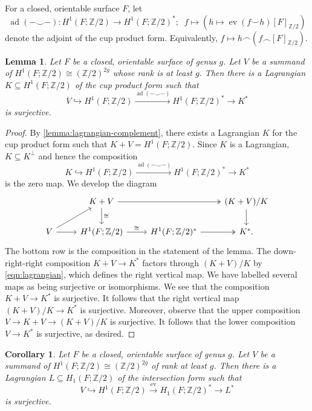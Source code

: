 \documentclass[a4paper, reqno]{amsart}
\newtheorem{corollary}[proposition]{Corollary}
\newtheorem{lemma}[proposition]{Lemma}
\theoremstyle{definition}
\theoremstyle{remark}
\newcommand{\Z}{\mathbb{Z}}
\newcommand{\into}{\hookrightarrow}
\DeclareMathOperator{\ev}{ev}
\begin{document}
For a closed, orientable surface $F$, let \[\operatorname{ad}(- \smile -) \colon H^1(F;\Z/2) \to H^1(F;\Z/2)^*;\; \; f \mapsto (h \mapsto \ev(f \smile h) [F]_{\Z/2})\] denote the adjoint of the cup product form. Equivalently, $f \mapsto h \frown (f \frown [F]_{\Z/2})$. 

\begin{lemma}\label{lemma:surjective-to-dual-of-lagrangian}
     Let $F$ be a closed, orientable surface of genus $g$. Let $V$ be a summand of $H^1(F;\Z/2)  \cong (\Z/2)^{2g}$ whose rank is at least $g$. Then there is a Lagrangian $K \subseteq H^1(F;\Z/2)$ of the cup product form such that 
     \[V \into H^1(F;\Z/2) \xrightarrow{\operatorname{ad}(- \smile -)} H^1(F;\Z/2)^* \to K^*\]
     is surjective. 
\end{lemma}

\begin{proof}
By \cref{lemma:lagrangian-complement}, there exists a Lagrangian $K$ for the cup product form such that $K +V = H^1(F;\Z/2)$. Since $K$ is a Lagrangian, $K \subseteq K^{\perp}$ and hence the composition
\begin{equation}\label{eqn:lagrangian}
    K \into H^1(F;\Z/2) \xrightarrow{\operatorname{ad}(- \smile -)} H^1(F;\Z/2)^* \to K^*
\end{equation}
is the zero map.  We develop the diagram
\[\begin{tikzcd}
 & K + V \ar[d,"\cong"] \ar[rr,twoheadrightarrow] & &   (K + V)/K \ar[d] \\
   V \ar[r] \ar[ur]  & H^1(F;\Z/2) \ar[r,"\cong"] &  H^1(F;\Z/2)^* \ar[r,twoheadrightarrow] & K^*.
\end{tikzcd}\]
The bottom row is the composition in the statement of the lemma. 
The down-right-right composition $K +V \to K^*$ factors through $(K+V)/K$ by \eqref{eqn:lagrangian}, which defines the right vertical map.  
We have labelled several maps as being surjective or isomorphisms. We see that the composition $K+V \to K^*$ is surjective. It follows that  the right vertical map $(K + V)/K \to K^*$ is surjective. Moreover, observe that the upper composition $V \to K+V \to (K + V)/K$ is surjective. It follows that the lower composition $V \to K^*$ is surjective, as desired. 
\end{proof}


\begin{corollary}\label{cor:surjective-to-dual-of-lagrangian}
     Let $F$ be a closed, orientable surface of genus $g$. Let $V$ be a summand of $H^1(F;\Z/2) \cong (\Z/2)^{2g}$ of rank at least $g$. Then there is a Lagrangian $L \subseteq H_1(F;\Z/2)$ of the intersection form such that 
     \[V \into H^1(F;\Z/2) \xrightarrow{\ev} H_1(F;\Z/2)^* \to L^*\]
     is surjective. 
\end{corollary}
\end{document}
